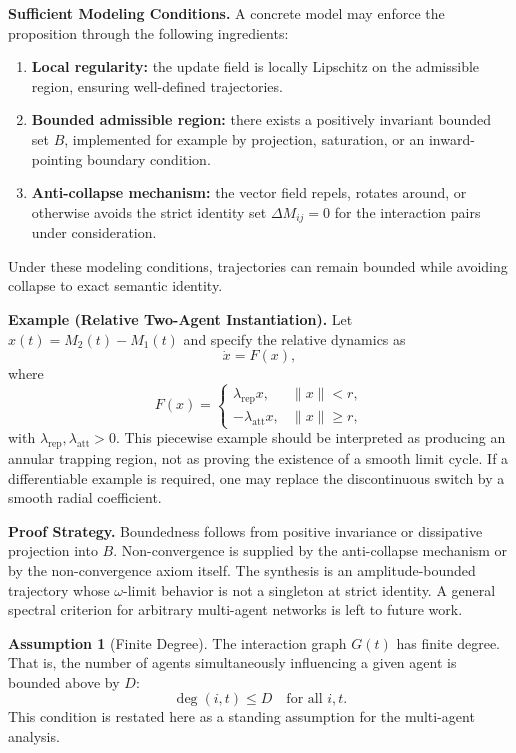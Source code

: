 \documentclass[11pt,a4paper]{article}
\theoremstyle{definition}
\newtheorem{assumption}{Assumption}[section]
\begin{document}
\textbf{Sufficient Modeling Conditions.}
A concrete model may enforce the proposition through the following ingredients:
\begin{enumerate}
\item[(SC1)] \textbf{Local regularity:} the update field is locally Lipschitz on the admissible region, ensuring well-defined trajectories.
\item[(SC2)] \textbf{Bounded admissible region:} there exists a positively invariant bounded set $B$, implemented for example by projection, saturation, or an inward-pointing boundary condition.
\item[(SC3)] \textbf{Anti-collapse mechanism:} the vector field repels, rotates around, or otherwise avoids the strict identity set $\Delta M_{ij}=0$ for the interaction pairs under consideration.
\end{enumerate}
Under these modeling conditions, trajectories can remain bounded while avoiding collapse to exact semantic identity.

\textbf{Example (Relative Two-Agent Instantiation).}
Let $x(t)=M_2(t)-M_1(t)$ and specify the relative dynamics as
\[
\dot{x}=F(x),
\]
where
\[
F(x)=
\begin{cases}
\lambda_{\mathrm{rep}}x, & \|x\|<r,\\
-\lambda_{\mathrm{att}}x, & \|x\|\geq r,
\end{cases}
\]
with $\lambda_{\mathrm{rep}},\lambda_{\mathrm{att}}>0$. This piecewise example should be interpreted as producing an annular trapping region, not as proving the existence of a smooth limit cycle. If a differentiable example is required, one may replace the discontinuous switch by a smooth radial coefficient.

\textbf{Proof Strategy.}
Boundedness follows from positive invariance or dissipative projection into $B$. Non-convergence is supplied by the anti-collapse mechanism or by the non-convergence axiom itself. The synthesis is an amplitude-bounded trajectory whose $\omega$-limit behavior is not a singleton at strict identity. A general spectral criterion for arbitrary multi-agent networks is left to future work.

\begin{assumption}[Finite Degree]
The interaction graph $G(t)$ has finite degree. That is, the number of agents simultaneously influencing a given agent is bounded above by $D$:
\[
\deg(i,t) \leq D \quad \text{for all } i, t.
\]
This condition is restated here as a standing assumption for the multi-agent analysis.
\end{assumption}
\end{document}
